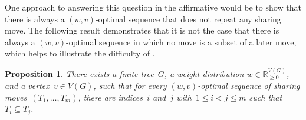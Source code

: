 \documentclass[reqno, 12pt]{amsart}
\numberwithin{equation}{section}
\numberwithin{figure}{section}
\theoremstyle{plain}
\newtheorem{proposition}[thm]{Proposition}
\theoremstyle{definition}
\newcommand*{\weights}{\ensuremath{\mathbb{R}_{\geq 0}^{V(G)}}}
\begin{document}
One approach to answering this question in the affirmative would be to show that there is always a $(w,v)$-optimal sequence that does not repeat any sharing move. 
The following  
result demonstrates that it is not the case that there is always a $(w,v)$-optimal sequence in which no move is a subset of a later move, which helps to illustrate the difficulty of .



\begin{proposition}
    \label{prop:counterexample}
    There exists a finite tree~$G$, a weight distribution ${w \in \weights}$, and a vertex~${v \in V(G)}$, such that for every ${(w, v)}$-optimal sequence of sharing moves~${(T_1, \dots, T_m)}$, there are indices~$i$ and~$j$ with~${1 \leq i < j \leq m}$ such that~${T_i \subseteq T_j}$. 
\end{proposition}
\end{document}
